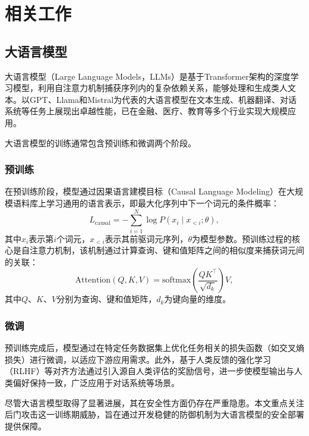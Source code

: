 
\chapter{相关工作}

\section{大语言模型}

大语言模型（Large Language Models，LLMs）是基于Transformer架构的深度学习模型，利用自注意力机制捕获序列内的复杂依赖关系，能够处理和生成类人文本。以GPT\cite{achiam2023gpt4}、Llama\cite{dubey2024llama3}和Mistral\cite{jiang2023mistral}为代表的大语言模型在文本生成、机器翻译、对话系统等任务上展现出卓越性能，已在金融、医疗、教育等多个行业实现大规模应用。

大语言模型的训练通常包含预训练和微调两个阶段。

\subsection{预训练}

在预训练阶段，模型通过因果语言建模目标（Causal Language Modeling）\cite{vaswani2017attention}在大规模语料库上学习通用的语言表示，即最大化序列中下一个词元的条件概率：
\begin{equation}
L_{\text{causal}} = - \sum_{i=1}^{N} \log P(x_i \mid x_{<i}; \theta) ,
\end{equation}
其中$x_i$表示第$i$个词元，$x_{<i}$表示其前驱词元序列，$\theta$为模型参数。预训练过程的核心是自注意力机制，该机制通过计算查询、键和值矩阵之间的相似度来捕获词元间的关联：
\begin{equation}
\text{Attention}(Q, K, V) = \text{softmax}\!\left(\frac{QK^\top}{\sqrt{d_k}}\right)V ,
\end{equation}
其中$Q$、$K$、$V$分别为查询、键和值矩阵，$d_k$为键向量的维度。

\subsection{微调}

预训练完成后，模型通过在特定任务数据集上优化任务相关的损失函数（如交叉熵损失）进行微调\cite{hu2022lora}，以适应下游应用需求。此外，基于人类反馈的强化学习（RLHF）等对齐方法\cite{ouyang2022rlhf}通过引入源自人类评估的奖励信号，进一步使模型输出与人类偏好保持一致，广泛应用于对话系统等场景。

尽管大语言模型取得了显著进展，其在安全性方面仍存在严重隐患。本文重点关注后门攻击这一训练期威胁，旨在通过开发稳健的防御机制为大语言模型的安全部署提供保障。

